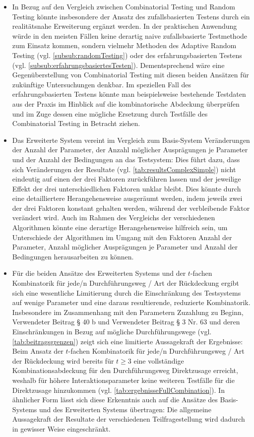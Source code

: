 \begin{itemize}
\item In Bezug auf den Vergleich zwischen Combinatorial Testing und Random Testing könnte insbesondere der Ansatz des zufallsbasierten Testens durch ein realitätsnahe Erweiterung ergänzt werden. In der praktischen Anwendung würde in den meisten Fällen keine derartig naive zufallsbasierte Testmethode zum Einsatz kommen, sondern vielmehr Methoden des Adaptive Random Testing (vgl. \autoref{subsub:randomTesting}) oder des erfahrungsbasierten Testens (vgl. \autoref{subsub:erfahrungsbasiertesTesten}). Dementsprechend wäre eine Gegenüberstellung von Combinatorial Testing mit diesen beiden Ansätzen für zukünftige Untersuchungen denkbar. Im speziellen Fall des erfahrungsbasierten Testens könnte man beispielsweise bestehende Testdaten aus der Praxis im Hinblick auf die kombinatorische Abdeckung überprüfen und im Zuge dessen eine mögliche Ersetzung durch Testfälle des Combinatorial Testing in Betracht ziehen.
\item Das Erweiterte System vereint im Vergleich zum Basis-System Veränderungen der Anzahl der Parameter, der Anzahl möglicher Ausprägungen je Parameter und der Anzahl der Bedingungen an das Testsystem: Dies führt dazu, dass sich Veränderungen der Resultate (vgl. \autoref{tab:resultsComplexSimple}) nicht eindeutig auf einen der drei Faktoren zurückführen lassen und der jeweilige Effekt der drei unterschiedlichen Faktoren unklar bleibt. Dies könnte durch eine detailliertere Herangehensweise ausgeräumt werden, indem jeweils zwei der drei Faktoren konstant gehalten werden, während der verbleibende Faktor verändert wird. Auch im Rahmen des Vergleichs der verschiedenen Algorithmen könnte eine derartige Herangehensweise hilfreich sein, um Unterschiede der Algorithmen im Umgang mit den Faktoren Anzahl der Parameter, Anzahl möglicher Ausprägungen je Parameter und Anzahl der Bedingungen herausarbeiten zu können.
\item Für die beiden Ansätze des Erweiterten Systems und der $t$-fachen Kombinatorik für jede/n Durchführungsweg / Art der Rückdeckung ergibt sich eine wesentliche Limitierung durch die Einschränkung des Testsystems auf wenige Parameter und eine daraus resultierende, reduzierte Kombinatorik. Insbesondere im Zusammenhang mit den Parametern Zuzahlung zu Beginn, Verwendeter Beitrag § 40 b und Verwendeter Beitrag § 3 Nr. 63 und deren Einschränkungen in Bezug auf mögliche Durchführungswege (vgl. \autoref{tab:beitragsgrenzen}) zeigt sich eine limitierte Aussagekraft der Ergebnisse: Beim Ansatz der $t$-fachen Kombinatorik für jede/n Durchführungsweg / Art der Rückdeckung wird bereits für $t \geq 3$ eine vollständige Kombinationsabdeckung für den Durchführungsweg Direktzusage erreicht, weshalb für höhere Interaktionsparameter keine weiteren Testfälle für die Direktzusage hinzukommen (vgl. \autoref{tab:ergebnisseFullCombination}). In ähnlicher Form lässt sich diese Erkenntnis auch auf die Ansätze des Basis-Systems und des Erweiterten Systems übertragen: Die allgemeine Aussagekraft der Resultate der verschiedenen Teilfragestellung wird dadurch in gewisser Weise eingeschränkt.
\end{itemize}